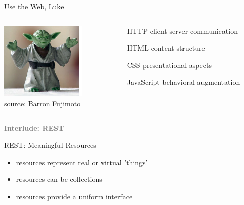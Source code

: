 \documentclass{beamer}
\begin{document}
\begin{frame}{Use the Web, Luke}
  \begin{columns}
    \begin{column}{4.0cm}
      \includegraphics[width=4cm]{images/yoda.png}
      \\
      \tiny source: \href{http://www.flickr.com/photos/barron/15483113/}{Barron Fujimoto}
    \end{column}

    \begin{column}{5.5cm}
      \begin{itemize}
        \item[HTTP] client-server communication
        \item[HTML] content structure
        \item[CSS] presentational aspects
        \item[JavaScript] behavioral augmentation
      \end{itemize}
    \end{column}
  \end{columns}
\end{frame}

\begin{frame}
  \vspace*{-1cm}
  \textcolor{gray}{
    \begin{center}
      \textbf{
        \fontsize{60}{60}\selectfont Interlude: REST
      }
    \end{center}
  }
\end{frame}

\begin{frame}{REST: Meaningful Resources}
  \begin{itemize}
    \item resources represent real or virtual 'things'
    \item resources can be collections
    \item resources provide a uniform interface
  \end{itemize}
\end{frame}
\end{document}
